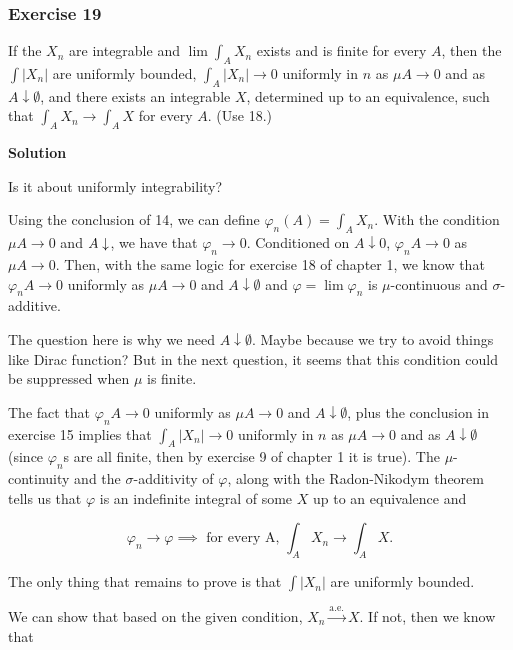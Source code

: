 \documentclass[
]{article}
\author{}
\date{}
\begin{document}
\hypertarget{exercise-19}{%
  \subsubsection{\texorpdfstring{Exercise 19
    }{Exercise 19 }}\label{exercise-19}}

If the \(X_n\) are integrable and \(\lim \int_A X_n\) exists and is
finite for every \(A\), then the \(\int\left|X_n\right|\) are uniformly
bounded, \(\int_A\left|X_n\right| \rightarrow 0\) uniformly in \(n\) as
\(\mu A \rightarrow 0\) and as \(A \downarrow \emptyset\), and there
exists an integrable \(X\), determined up to an equivalence, such that
\(\int_A X_n \rightarrow \int_A X\) for every \(A\). (Use 18.)

\textbf{Solution}

Is it about uniformly integrability?

Using the conclusion of 14, we can define \(\varphi_n(A) = \int_A X_n\).
With the condition \(\mu A \to 0\) and \(A \downarrow \empty\), we have
that \(\varphi_n \to 0\). Conditioned on \(A\downarrow 0\),
\(\varphi_n A \to 0\) as \(\mu A \to 0\). Then, with the same logic for
exercise 18 of chapter 1, we know that \(\varphi_n A \to 0\) uniformly
as \(\mu A \to 0\) and \(A \downarrow \emptyset\) and
\(\varphi = \lim \varphi_n\) is \(\mu\)-continuous and
\(\sigma\)-additive.

The question here is why we need \(A\downarrow\emptyset\). Maybe because
we try to avoid things like Dirac function? But in the next question, it
seems that this condition could be suppressed when \(\mu\) is finite.

The fact that \(\varphi_n A \to 0\) uniformly as \(\mu A \to 0\) and
\(A \downarrow \emptyset\), plus the conclusion in exercise 15 implies
that \(\int_A\left|X_n\right| \rightarrow 0\) uniformly in \(n\) as
\(\mu A \rightarrow 0\) and as \(A \downarrow \emptyset\) (since
\(\varphi_n\)\textquotesingle s are all finite, then by exercise 9 of
chapter 1 it is true). The \(\mu\)-continuity and the
\(\sigma\)-additivity of \(\varphi\), along with the Radon-Nikodym
theorem tells us that \(\varphi\) is an indefinite integral of some
\(X\) up to an equivalence and

\[\varphi_n \to \varphi \implies \text{ for every A, } \int_A X_n \to \int_A X.\]

The only thing that remains to prove is that \(\int |X_n|\) are
uniformly bounded.

We can show that based on the given condition,
\(X_n \xrightarrow{\text{a.e.}} X\). If not, then we know that
\end{document}
